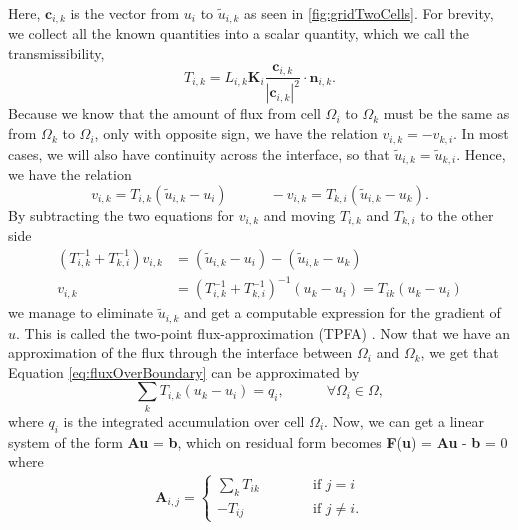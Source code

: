 Here, $\textbf{c}_{i,k}$ is the vector from $u_i$ to $\tilde{u}_{i,k}$ as seen in \autoref{fig:gridTwoCells}.  For brevity, we collect all the known quantities into a scalar quantity, which we call the transmissibility,
\begin{equation}
    T_{i,k} = L_{i,k}\textbf{K}_i\frac{\textbf{c}_{i,k}}{|\textbf{c}_{i,k}|^2} \cdot \textbf{n}_{i,k}.
    \label{eq:transmissibility}
\end{equation}
Because we know that the amount of flux from cell $\Omega_i$ to $\Omega_k$ must be the same as from $\Omega_k$ to $\Omega_i$, only with opposite sign, we have the relation $v_{i,k} = -v_{k,i}$.  In most cases, we will also have continuity across the interface, so that $\tilde{u}_{i,k} = \tilde{u}_{k,i}$. Hence, we have the relation 
\begin{equation*}
    v_{i,k} = T_{i,k}(\tilde{u}_{i,k} - u_i) \hspace{3em} -v_{i,k} = T_{k,i}(\tilde{u}_{i,k} - u_k).
\end{equation*}
By subtracting the two equations for $v_{i,k}$ and moving $T_{i,k}$ and $T_{k,i}$ to the other side 
\begin{equation}
    \begin{aligned}
        (T_{i,k}^{-1} + T_{k,i}^{-1}) v_{i,k} &= (\tilde{u}_{i,k} - u_i) - (\tilde{u}_{i,k} - u_k)
        \\
        v_{i,k} &= (T_{i,k}^{-1} + T_{k,i}^{-1})^{-1}(u_k - u_i) = T_{ik}(u_k - u_i)
    \end{aligned}
    \label{eq:flux}
\end{equation}
we manage to eliminate $\tilde{u}_{i,k}$ and get a computable expression for the gradient of $u$. This is called the two-point flux-approximation (TPFA) \citep{lieMrstUrl}. Now that we have an approximation of the flux through the interface between $\Omega_i$ and $\Omega_k$, we get that Equation \eqref{eq:fluxOverBoundary} can be approximated by 
\begin{equation}
    \sum_k T_{i,k}(u_k - u_i) = q_i, \hspace{3em} \forall \Omega_i \in \Omega,
    \label{eq:PoissonSolvableTwoCells}
\end{equation}
where $q_i$ is the integrated accumulation over cell $\Omega_i$. Now, we can get a linear system of the form \textbf{A}\textbf{u} = \textbf{b},  which on residual form becomes \textbf{F}(\textbf{u}) = \textbf{A}\textbf{u} - \textbf{b} = 0 where
\begin{align*}
    \textbf{A}_{i,j} = 
    \left\lbrace
    \begin{array}{lr}
    \sum_k T_{ik} \hspace{3em}&\text{if } j = i\\
    -T_{ij} \hspace{3em}&\text{if } j \neq i.
    \end{array}
    \right.
\end{align*}
